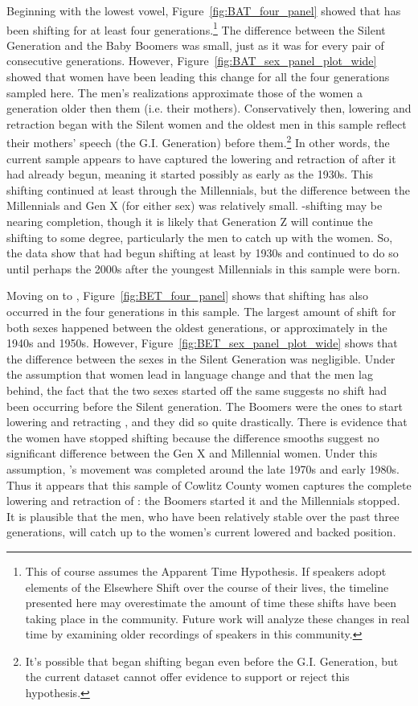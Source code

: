 Beginning with the lowest vowel, Figure~\ref{fig:BAT_four_panel} showed that \bat has been shifting for at least four generations.\footnote{This of course assumes the Apparent Time Hypothesis. If speakers adopt elements of the Elsewhere Shift over the course of their lives, the timeline presented here may overestimate the amount of time these shifts have been taking place in the community. Future work will analyze these changes in real time by examining older recordings of speakers in this community.} The difference between the Silent Generation and the Baby Boomers was small, just as it was for every pair of consecutive generations. However, Figure~\ref{fig:BAT_sex_panel_plot_wide} showed that women have been leading this change for all the four generations sampled here. The men's realizations approximate those of the women a generation older then them (i.e. their mothers). Conservatively then, \bat lowering and retraction began with the Silent women and the oldest men in this sample reflect their mothers' speech (the G.I. Generation) before them.\footnote{It's possible that \bat began shifting began even before the G.I. Generation, but the current dataset cannot offer evidence to support or reject this hypothesis.} In other words, the current sample appears to have captured the lowering and retraction of \bat after it had already begun, meaning it started possibly as early as the 1930s. This shifting continued at least through the Millennials, but the difference between the Millennials and Gen X (for either sex) was relatively small. \bat-shifting may be nearing completion, though it is likely that Generation Z will continue the shifting to some degree, particularly the men to catch up with the women. So, the data show that \bat had begun shifting at least by 1930s and continued to do so until perhaps the 2000s after the youngest Millennials in this sample were born.

Moving on to \bet, Figure~\ref{fig:BET_four_panel} shows that shifting has also occurred in the four generations in this sample. The largest amount of shift for both sexes happened between the oldest generations, or approximately in the 1940s and 1950s. However, Figure~\ref{fig:BET_sex_panel_plot_wide} shows that the difference between the sexes in the Silent Generation was negligible. Under the assumption that women lead in language change and that the men lag behind, the fact that the two sexes started off the same suggests no shift had been occurring before the Silent generation. The Boomers were the ones to start lowering and retracting \bet, and they did so quite drastically. There is evidence that the women have stopped shifting because the difference smooths suggest no significant difference between the Gen X and Millennial women. Under this assumption, \bet's movement was completed around the late 1970s and early 1980s. Thus it appears that this sample of Cowlitz County women captures the complete lowering and retraction of \bet: the Boomers started it and the Millennials stopped. It is plausible that the men, who have been relatively stable over the past three generations, will catch up to the women's current lowered and backed position.

